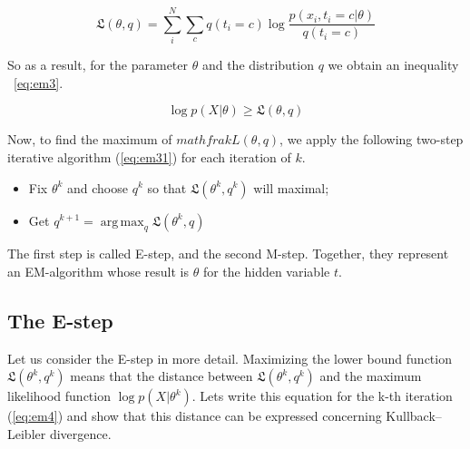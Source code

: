 \documentclass[12pt]{report}
\theoremstyle{definition}
\begin{document}
\begin{equation} \label{eq:em2}
\mathfrak{L} \left( \theta, q \right) = \sum_i^N \sum_c q \left( t_i = c \right) \log \frac{p \left( x_i, t_i = c \vert \theta \right)}{q \left( t_i = c \right)}
\end{equation}

So as a result, for the parameter $\theta$ and the distribution $q$ we obtain an inequality ~\ref{eq:em3}.

\begin{equation} \label{eq:em3}
\log p \left(  X \vert	\theta \right) \geqslant \mathfrak{L}\left( \theta, q \right)
\end{equation}

Now, to find the maximum of $mathfrak{L} \left( \theta, q \right)$, we apply the following two-step iterative algorithm (\ref{eq:em31}) for each iteration of $k$.

\begin{itemize}\label{eq:em31}
	\item Fix $\theta^k$ and choose $q^k$ so that $\mathfrak{L} \left( \theta^k, q^k \right)$ will maximal; 
	\item Get  $q^{k+1} = \operatorname*{arg\,max}_q \mathfrak{L} \left( \theta^k, q \right)$
\end{itemize}

The first step is called E-step, and the second M-step. 
Together, they represent an EM-algorithm whose result is $\theta$ for the hidden variable $t$.

\subsection{The E-step}

Let us consider the E-step in more detail. 
Maximizing the lower bound function $\mathfrak{L} \left( \theta^k, q^k \right)$ means that the distance between $\mathfrak{L} \left( \theta^k, q^k \right)$ and the maximum likelihood function $\log p \left( X \vert \theta^k \right)$. 
Lets write this equation for the k-th iteration (\ref{eq:em4}) and show that this distance can be expressed concerning Kullback–Leibler divergence.
\end{document}
